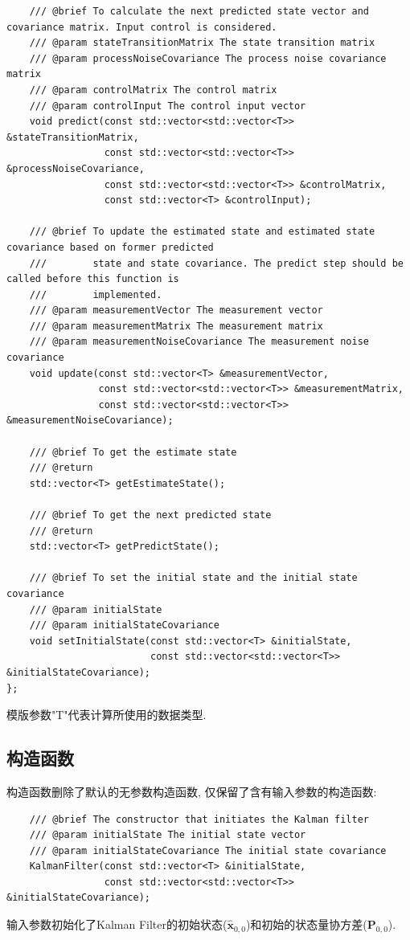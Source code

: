 \documentclass[12pt]{article}
\begin{document}
\begin{lstlisting}
    /// @brief To calculate the next predicted state vector and covariance matrix. Input control is considered.
    /// @param stateTransitionMatrix The state transition matrix
    /// @param processNoiseCovariance The process noise covariance matrix
    /// @param controlMatrix The control matrix
    /// @param controlInput The control input vector
    void predict(const std::vector<std::vector<T>> &stateTransitionMatrix,
                 const std::vector<std::vector<T>> &processNoiseCovariance,
                 const std::vector<std::vector<T>> &controlMatrix,
                 const std::vector<T> &controlInput);
    
    /// @brief To update the estimated state and estimated state covariance based on former predicted 
    ///        state and state covariance. The predict step should be called before this function is 
    ///        implemented.
    /// @param measurementVector The measurement vector
    /// @param measurementMatrix The measurement matrix
    /// @param measurementNoiseCovariance The measurement noise covariance
    void update(const std::vector<T> &measurementVector,
                const std::vector<std::vector<T>> &measurementMatrix,
                const std::vector<std::vector<T>> &measurementNoiseCovariance);
                
    /// @brief To get the estimate state
    /// @return
    std::vector<T> getEstimateState();
    
    /// @brief To get the next predicted state
    /// @return
    std::vector<T> getPredictState();
    
    /// @brief To set the initial state and the initial state covariance
    /// @param initialState 
    /// @param initialStateCovariance 
    void setInitialState(const std::vector<T> &initialState,
                         const std::vector<std::vector<T>> &initialStateCovariance);
};
\end{lstlisting}
模版参数"T"代表计算所使用的数据类型. 

\subsection{构造函数}

构造函数删除了默认的无参数构造函数, 仅保留了含有输入参数的构造函数:
\begin{lstlisting}
    /// @brief The constructor that initiates the Kalman filter
    /// @param initialState The initial state vector
    /// @param initialStateCovariance The initial state covariance
    KalmanFilter(const std::vector<T> &initialState,
                 const std::vector<std::vector<T>> &initialStateCovariance);
\end{lstlisting}
输入参数初始化了Kalman Filter的初始状态($\hat{\bm{x}}_{0,0}$)和初始的状态量协方差($\bm{P}_{0,0}$).
\end{document}
